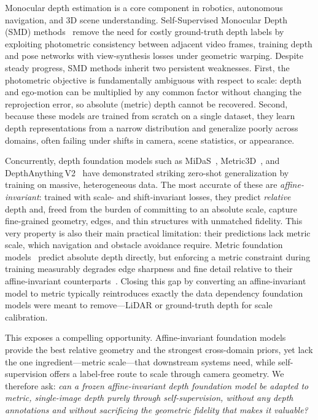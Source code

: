 \documentclass[journal]{IEEEtran}
\begin{document}
Monocular depth estimation is a core component in robotics, autonomous navigation, and 3D scene understanding. Self-Supervised Monocular Depth (SMD) methods~\cite{zhou2017unsupervised,8100182,godard2019digging} remove the need for costly ground-truth depth labels by exploiting photometric consistency between adjacent video frames, training depth and pose networks with view-synthesis losses under geometric warping. Despite steady progress, SMD methods inherit two persistent weaknesses. First, the photometric objective is fundamentally ambiguous with respect to scale: depth and ego-motion can be multiplied by any common factor without changing the reprojection error, so absolute (metric) depth cannot be recovered. Second, because these models are trained from scratch on a single dataset, they learn depth representations from a narrow distribution and generalize poorly across domains, often failing under shifts in camera, scene statistics, or appearance.

Concurrently, depth foundation models such as MiDaS~\cite{ranftl2020towards}, Metric3D~\cite{liu2024metricdepth}, and DepthAnything\,V2~\cite{yang2024depth} have demonstrated striking zero-shot generalization by training on massive, heterogeneous data. The most accurate of these are \emph{affine-invariant}: trained with scale- and shift-invariant losses, they predict \emph{relative} depth and, freed from the burden of committing to an absolute scale, capture fine-grained geometry, edges, and thin structures with unmatched fidelity. This very property is also their main practical limitation: their predictions lack metric scale, which navigation and obstacle avoidance require. Metric foundation models~\cite{bhat2023zoedepth,yin2023metric3d,piccinelli2024unidepth} predict absolute depth directly, but enforcing a metric constraint during training measurably degrades edge sharpness and fine detail relative to their affine-invariant counterparts~\cite{li2025benchdepth}. Closing this gap by converting an affine-invariant model to metric typically reintroduces exactly the data dependency foundation models were meant to remove---LiDAR or ground-truth depth for scale calibration.

This exposes a compelling opportunity. Affine-invariant foundation models provide the best relative geometry and the strongest cross-domain priors, yet lack the one ingredient---metric scale---that downstream systems need, while self-supervision offers a label-free route to scale through camera geometry. We therefore ask: \emph{can a frozen affine-invariant depth foundation model be adapted to metric, single-image depth purely through self-supervision, without any depth annotations and without sacrificing the geometric fidelity that makes it valuable?}
\end{document}
